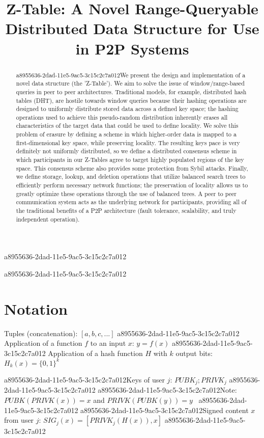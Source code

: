 \documentclass[12pt]{article}
\title{Z-Table: A Novel Range-Queryable Distributed Data Structure for Use in P2P Systems}
\begin{document}
\maketitle
a8955636-2dad-11e5-9ac5-3c15c2c7a012
\begin{abstract}
a8955636-2dad-11e5-9ac5-3c15c2c7a012We present the design and implementation of a novel data structure (the 'Z-Table'). We aim to solve the issue of window/range-based queries in peer to peer architectures. Traditional models, for example,  distributed hash tables (DHT), are hostile towards window queries because their hashing operations are designed to uniformly distribute stored data across a defined key space; the hashing operations used to achieve this pseudo-random distribution inherently erases all characteristics of the target data that could be used to define locality. We solve this problem of erasure by defining a scheme in which higher-order data is mapped to a first-dimensional key space, while preserving locality. The resulting keys pace is very definitely not uniformly distributed, so we define a distributed consensus scheme in which participants in our Z-Tables agree to target highly populated regions of the key space. This consensus scheme also provides some protection from Sybil attacks. Finally, we define storage, lookup, and deletion operations that utilize balanced search trees to efficiently perform necessary network functions; the preservation of locality allows us to greatly optimize these operations through the use of balanced trees. A peer to peer communication system acts as the underlying network for participants, providing all of the traditional benefits of a P2P architecture (fault tolerance, scalability, and truly independent operation).
\end{abstract}

a8955636-2dad-11e5-9ac5-3c15c2c7a012\section{Notation}

Tuples (concatenation): $[a,b,c,...]$
a8955636-2dad-11e5-9ac5-3c15c2c7a012
Application of a function $f$ to an input $x$: $y=f(x)$
a8955636-2dad-11e5-9ac5-3c15c2c7a012
Application of a hash function $H$ with $k$ output bits: $H_{k}(x) = \{0,1\}^k$

a8955636-2dad-11e5-9ac5-3c15c2c7a012Keys of user $j$: $ PUBK_j; PRIVK_j $
a8955636-2dad-11e5-9ac5-3c15c2c7a012
a8955636-2dad-11e5-9ac5-3c15c2c7a012Note: $PUBK(PRIVK(x)) = x$ and $PRIVK(PUBK(y)) = y$~
a8955636-2dad-11e5-9ac5-3c15c2c7a012
a8955636-2dad-11e5-9ac5-3c15c2c7a012Signed content $x$ from user $j$: $SIG_j(x) = \left[ PRIVK_j( H(x) ), x \right]$
a8955636-2dad-11e5-9ac5-3c15c2c7a012
\end{document}
